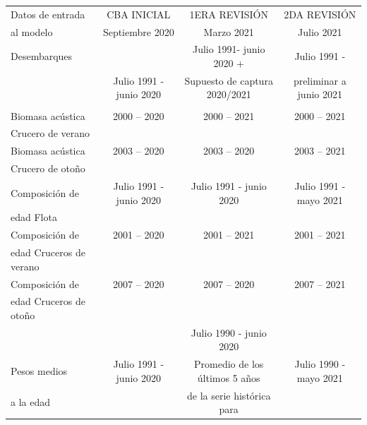 \documentclass[
  spanish,
]{article}
\begin{document}
\begin{table}[h]
    \centering
    \resizebox{16cm}{!} {
    \begin{tabular}{|l|c|c|c|}
    \hline
  Datos de entrada  & CBA INICIAL                & 1ERA REVISIÓN                   & 2DA REVISIÓN  \\ 
  al modelo         & Septiembre 2020          & Marzo 2021                      & Julio 2021 \\ \hline
  Desembarques      &                            & Julio 1991- junio 2020 +        & Julio 1991 - \\
                    & Julio 1991 - junio 2020  & Supuesto de captura 2020/2021   & preliminar a junio 2021 \\
                    &                          &                                   &  \\ \hline
  Biomasa acústica  & 2000 – 2020                & 2000 – 2021                     &    2000 – 2021 \\
  Crucero de verano &                          &                                 & \\ \hline
  Biomasa acústica  & 2003 – 2020              & 2003 – 2020                     & 2003 – 2021 \\
  Crucero de otoño  &                          &                                 & \\ \hline
  Composición de    & Julio 1991 - junio 2020  & Julio 1991 - junio 2020         & Julio 1991 - mayo 2021  \\
  edad Flota        &                          &                                 & \\ \hline
  Composición de    & 2001 – 2020              & 2001 – 2021                       & 2001 – 2021 \\
  edad Cruceros de verano&                     &                                 & \\ \hline
  Composición de    & 2007 – 2020              & 2007 – 2020                     & 2007 – 2021 \\
  edad Cruceros de otoño&                      &                                 & \\ \hline
                    &                          & Julio 1990 - junio 2020         & \\
  Pesos medios      & Julio 1991 - junio 2020  & Promedio de los últimos 5 años  & Julio 1990 - mayo 2021 \\
  a la edad         &                          & de la serie histórica para      & \\ 

\end{tabular}}
\end{table}
\end{document}
